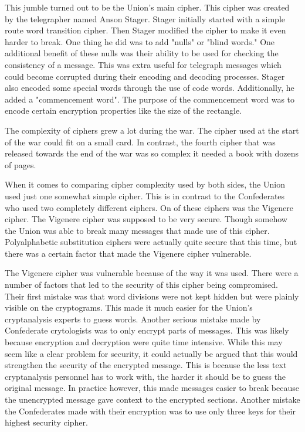 \documentclass{article}
\begin{document}
    This jumble turned out to be the Union's main cipher. This cipher was
    created by the telegrapher named Anson Stager. Stager initially started
    with a simple route word transition cipher. Then Stager modified the cipher
    to make it even harder to break. One thing he did was to add "nulls" or "blind words."
    One additional benefit of these nulls was their ability to be used for checking
    the consistency of a message. This was extra useful for telegraph messages which
    could become corrupted during their encoding and decoding processes.
    Stager also encoded some special words through the use of code words.
    Additionally, he added a "commencement word". The purpose of the commencement
    word was to encode certain encryption properties like the size of the rectangle.

    The complexity of ciphers grew a lot during the war. The cipher used
    at the start of the war could fit on a small card. In contrast, the fourth cipher
    that was released towards the end of the war was so complex it needed
    a book with dozens of pages.

    When it comes to comparing cipher complexity used by both sides, the Union used
    just one somewhat simple cipher. This is in contrast to the Confederates who
    used two completely different ciphers. On of these ciphers was the
    Vigenere cipher. The Vigenere cipher was supposed to be very secure.
    Though somehow the Union was able to break many messages that made use of this cipher.
    Polyalphabetic substitution ciphers were actually quite secure that this time,
    but there was a certain factor that made the Vigenere cipher vulnerable.

    The Vigenere cipher was vulnerable because of the way it was used.
    There were a number of factors that led to the security of this cipher being
    compromised.
    Their first mistake was that word divisions were not kept hidden but were
    plainly visible on the cryptograms. This made it much easier for the Union's
    cryptanalysis experts to guess words.
    Another serious mistake made by Confederate crytologists was to only
    encrypt parts of messages. This was likely because encryption and decryption
    were quite time intensive.
    While this may seem like a clear problem for security, it could actually
    be argued that this would strengthen the security of the encrypted message.
    This is because the less text cryptanalysis personnel has to work with,
    the harder it should be to guess the original message.
    In practice however, this made messages easier to break because the unencrypted
    message gave context to the encrypted sections.
    Another mistake the Confederates made with their encryption was to use
    only three keys for their highest security cipher.
\end{document}
